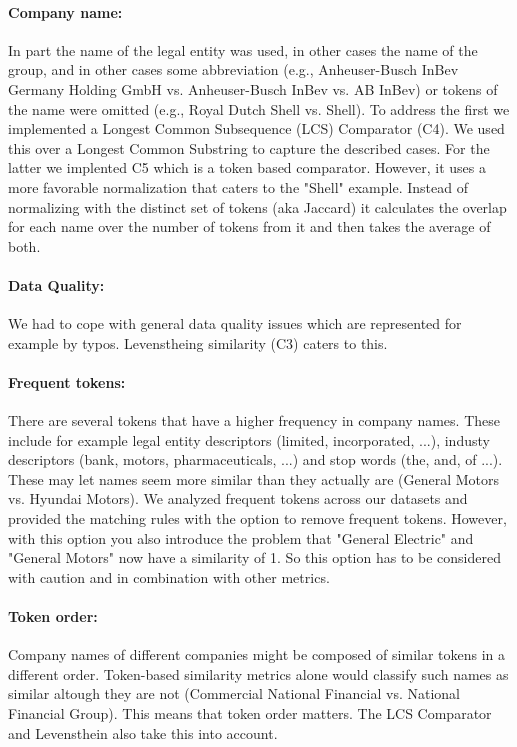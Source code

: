 \documentclass[11pt,titlepage,oneside,openany]{article}
\begin{document}
\paragraph{Company name: }In part the name of the legal entity was used, in other cases the name of the group, and in other cases some abbreviation (e.g., Anheuser-Busch InBev Germany Holding GmbH vs. Anheuser-Busch InBev vs. AB InBev) or tokens of the name were omitted (e.g., Royal Dutch Shell vs. Shell). To address the first we implemented a Longest Common Subsequence (LCS) Comparator (C4). We used this over a Longest Common Substring to capture the described cases. For the latter we implented C5 which is a token based comparator. However, it uses a more favorable normalization that caters to the "Shell" example. Instead of normalizing with the distinct set of tokens (aka Jaccard) it calculates the overlap for each name over the number of tokens from it and then takes the average of both.

\paragraph{Data Quality:} We had to cope with general data quality issues which are represented for example by typos. Levenstheing similarity (C3) caters to this.

\paragraph{Frequent tokens:} There are several tokens that have a higher frequency in company names. These include for example legal entity descriptors (limited, incorporated, ...), industy descriptors (bank, motors, pharmaceuticals, ...) and stop words (the, and, of ...). These may let names seem more similar than they actually are (General Motors vs. Hyundai Motors). We analyzed frequent tokens across our datasets and provided the matching rules with the option to remove frequent tokens. However, with this option you also introduce the problem that "General Electric" and "General Motors" now have a similarity of 1. So this option has to be considered with caution and in combination with other metrics.

\paragraph{Token order:} Company names of different companies might be composed of similar tokens in a different order. Token-based similarity metrics alone would classify such names as similar altough they are not (Commercial National Financial vs. National Financial Group). This means that token order matters. The LCS Comparator and Levensthein also take this into account.
\end{document}

